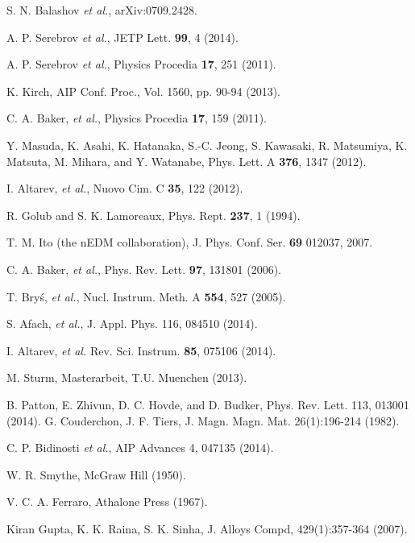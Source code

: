 \documentclass[review]{elsarticle}
\begin{document}

\begin{thebibliography}{00}

 S. N. Balashov {\it et al.}, arXiv:0709.2428.

 A. P. Serebrov {\it et al.}, JETP Lett. {\bf 99}, 4
  (2014).

 A. P. Serebrov {\it et al.}, Physics Procedia {\bf
  17}, 251 (2011).

 K. Kirch, AIP Conf. Proc., Vol. 1560, pp. 90-94
  (2013).

 C. A. Baker, {\it et al.}, Physics Procedia {\bf
  17}, 159 (2011).

 Y. Masuda, K. Asahi, K. Hatanaka, S.-C. Jeong,
  S. Kawasaki, R. Matsumiya, K. Matsuta, M. Mihara, and Y. Watanabe,
  Phys. Lett. A {\bf 376}, 1347 (2012).

 I. Altarev, {\it et al.}, Nuovo Cim. C {\bf
  35}, 122 (2012).

 R. Golub and S. K. Lamoreaux, Phys. Rept.  {\bf
  237}, 1 (1994).

 T. M. Ito (the nEDM collaboration),
  J. Phys. Conf. Ser. {\bf 69} 012037, 2007.

 C. A. Baker, {\it et al.}, Phys. Rev. Lett. {\bf
  97}, 131801 (2006).

 T. Bry\'s, {\it et al.}, Nucl. Instrum. Meth. A
  {\bf 554}, 527 (2005).

 S. Afach, {\it et al.}, J. Appl. Phys. 116, 084510 (2014).

 I. Altarev, {\it et al.}
  Rev. Sci. Instrum. {\bf 85}, 075106 (2014).

 M. Sturm, Masterarbeit, T.U. Muenchen (2013).

 B. Patton, E. Zhivun, D. C. Hovde, and D. Budker,
  Phys. Rev. Lett. 113, 013001 (2014).
 G. Couderchon, J. F. Tiers, J. Magn. Magn. Mat. 26(1):196-214 (1982).

 C. P. Bidinosti {\it et al.}, AIP Advances 4, 047135 (2014).

 W. R. Smythe, McGraw Hill (1950).

 V. C. A. Ferraro, Athalone Press (1967).

 Kiran Gupta, K. K. Raina, S. K. Sinha, J. Alloys Compd, 429(1):357-364 (2007).


\end{thebibliography}
\end{document}

